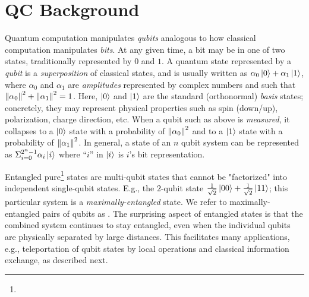 \section{QC Background}
\label{sec:swapping_background}

Quantum computation manipulates \emph{qubits}
analogous to how classical computation manipulates \emph{bits}.  
At any given time, a bit may be in one of two states, traditionally represented by $0$
and $1$.  A quantum state represented by a
\emph{qubit} is a \emph{superposition} of classical
states, and is usually written as $\alpha_0\ket{0} + \alpha_1\ket{1}$,
where $\alpha_0$ and $\alpha_1$ are \emph{amplitudes} represented by
complex numbers and such that $\norm{\alpha_0}^2 + \norm{\alpha_1}^2 = 1$.
Here, $\ket{0}$ and $\ket{1}$ are the standard (orthonormal) 
\emph{basis} states; concretely, they
may represent physical properties such as spin (down/up),
polarization, charge direction, etc.
When a qubit such as above is \textit{measured}, it collapses to a 
$\ket{0}$ state with a probability of $\norm{\alpha_0}^2$ and to
a $\ket{1}$ state with a probability of $\norm{\alpha_1}^2$.
In general, a state of an $n$ qubit
system can be represented as $\Sigma_{i=0}^{2^n-1} \alpha_i\ket{i}$
 where ``$i$'' in $\ket{i}$ is $i$'s bit representation. 

Entangled pure\footnote{}
states are multi-qubit states that cannot be
"factorized" into independent single-qubit states.
E.g., the 
$2$-qubit state $\frac{1}{\sqrt{2}}\ket{00}
+ \frac{1}{\sqrt{2}}\ket{11}$; this particular system is a
\emph{maximally-entangled} state. 
We refer to maximally-entangled pairs of qubits as \epss.
The surprising aspect of entangled states is that the combined
system continues to stay entangled, even when 
the individual qubits are physically separated by large distances.
This facilitates many applications, e.g., teleportation of qubit
states by local operations and classical information exchange, as
described next.

